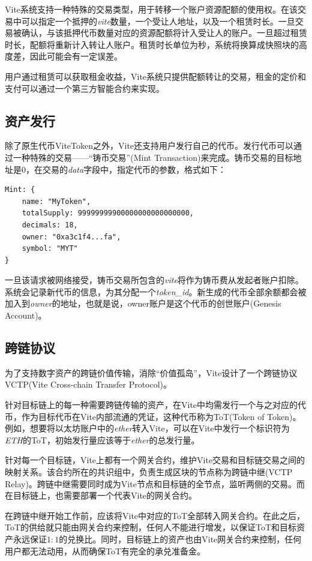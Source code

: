 \documentclass[UTF8,nofonts]{ctexart}
\begin{document}
\begin{multicols}{2}
Vite系统支持一种特殊的交易类型，用于转移一个账户资源配额的使用权。在该交易中可以指定一个抵押的\textit{vite}数量，一个受让人地址，以及一个租赁时长。一旦交易被确认，与该抵押代币数量对应的资源配额将计入受让人的账户。一旦超过租赁时长，配额将重新计入转让人账户。租赁时长单位为秒，系统将换算成快照块的高度差，因此可能会有一定误差。

用户通过租赁可以获取租金收益，Vite系统只提供配额转让的交易，租金的定价和支付可以通过一个第三方智能合约来实现。

\subsection{资产发行}
除了原生代币ViteToken之外，Vite还支持用户发行自己的代币。发行代币可以通过一种特殊的交易——“铸币交易”(Mint Transaction)来完成。铸币交易的目标地址是0，在交易的\textit{data}字段中，指定代币的参数，格式如下：
\begin{verbatim}
Mint: {
    name: "MyToken",
   	totalSupply: 99999999900000000000000000,
   	decimals: 18,
   	owner: "0xa3c1f4...fa",
    symbol: "MYT"
}
\end{verbatim}

一旦该请求被网络接受，铸币交易所包含的\textit{vite}将作为铸币费从发起者账户扣除。系统会记录新代币的信息，为其分配一个\textit{token\_id}。新生成的代币全部余额都会被加入到\textit{owner}的地址，也就是说，owner账户是这个代币的创世账户(Genesis Account)。

\subsection{跨链协议}
为了支持数字资产的跨链价值传输，消除“价值孤岛”，Vite设计了一个跨链协议VCTP(Vite Cross-chain Transfer Protocol)。

针对目标链上的每一种需要跨链传输的资产，在Vite中均需发行一个与之对应的代币，作为目标代币在Vite内部流通的凭证，这种代币称为ToT(Token of Token)。例如，想要将以太坊账户中的\textit{ether}转入Vite，可以在Vite中发行一个标识符为\textit{ETH}的ToT，初始发行量应该等于\textit{ether}的总发行量。

针对每一个目标链，Vite上都有一个网关合约，维护Vite交易和目标链交易之间的映射关系。该合约所在的共识组中，负责生成区块的节点称为跨链中继(VCTP Relay)。跨链中继需要同时成为Vite节点和目标链的全节点，监听两侧的交易。而在目标链上，也需要部署一个代表Vite的网关合约。

在跨链中继开始工作前，应该将Vite中对应的ToT全部转入网关合约。在此之后，ToT的供给就只能由网关合约来控制，任何人不能进行增发，以保证ToT和目标资产永远保证$1:1$的兑换比。同时，目标链上的资产也由Vite网关合约来控制，任何用户都无法动用，从而确保ToT有完全的承兑准备金。


\end{multicols}
\end{document}
